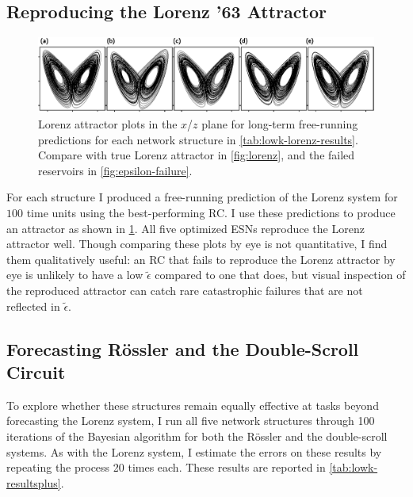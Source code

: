\subsection{Reproducing the Lorenz '63 Attractor}

\begin{figure}
  \includegraphics[width=\textwidth]{figures/lowk-attractors}
  \caption{Lorenz attractor plots in the $x$/$z$ plane for long-term
    free-running predictions for each network structure in
    \cref{tab:lowk-lorenz-results}. Compare with true Lorenz attractor
    in \cref{fig:lorenz}, and the failed reservoirs in
    \cref{fig:epsilon-failure}.}%
  \label{fig:lowk-attractors}
\end{figure}

For each structure I produced a free-running prediction of
the Lorenz system for $100$ time units using the best-performing RC.\@
I use these predictions to produce an attractor as shown in
\cref{fig:lowk-attractors}. All five optimized ESNs reproduce the
Lorenz attractor well. Though comparing these plots by eye is not
quantitative, I find them qualitatively useful: an RC that fails to
reproduce the Lorenz attractor by eye is unlikely to have a low
$\tilde{\epsilon}$ compared to one that does, but visual inspection of
the reproduced attractor can catch rare catastrophic failures that are
not reflected in $\tilde{\epsilon}$.

\subsection{Forecasting R{\"{o}}ssler and the Double-Scroll Circuit}

To explore whether these structures remain equally effective at tasks
beyond forecasting the Lorenz system, I run all five network
structures through 100 iterations of the Bayesian algorithm for both
the R{\"{o}}ssler and the double-scroll systems. As with the Lorenz
system, I estimate the errors on these results by repeating the
process 20 times each. These results are reported in
\cref{tab:lowk-resultsplus}.

